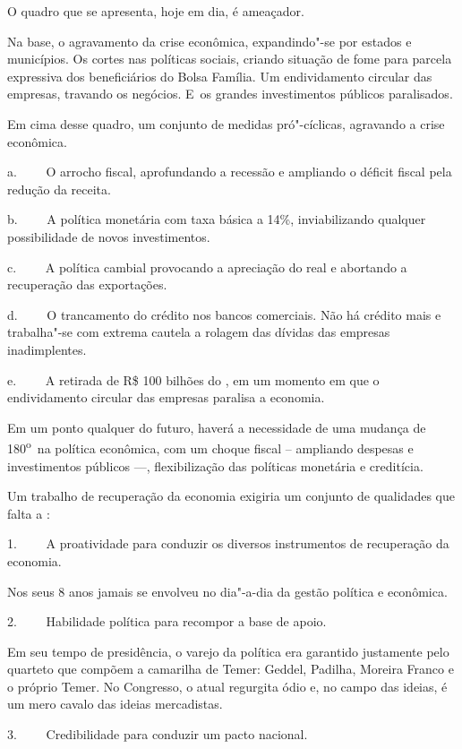 O quadro que se apresenta, hoje em dia, é ameaçador.

Na base, o agravamento da crise econômica, expandindo"-se por estados e
municípios. Os cortes nas políticas sociais, criando situação de fome
para parcela expressiva dos beneficiários do Bolsa Família. Um
endividamento circular das empresas, travando os negócios. E~os grandes
investimentos públicos paralisados.

Em cima desse quadro, um conjunto de medidas pró"-cíclicas, agravando a
crise econômica.

a.~~~~ O arrocho fiscal, aprofundando a recessão e ampliando o déficit
fiscal pela redução da receita.

b.~~~~ A política monetária com taxa básica a 14\%, inviabilizando
qualquer possibilidade de novos investimentos.

c.~~~~ A política cambial provocando a apreciação do real e abortando a
recuperação das exportações.

d.~~~~ O trancamento do crédito nos bancos comerciais. Não há crédito
mais e trabalha"-se com extrema cautela a rolagem das dívidas das
empresas inadimplentes.

e.~~~~ A retirada de R\$ 100 bilhões do , em um momento em que o
endividamento circular das empresas paralisa a economia.

Em um ponto qualquer do futuro, haverá a necessidade de uma mudança de
180\textsuperscript{o}~na política econômica, com um choque fiscal --
ampliando despesas e investimentos públicos \mbox{---,} flexibilização das
políticas monetária e creditícia.

Um trabalho de recuperação da economia exigiria um conjunto de
qualidades que falta a :

1.~~~~ A proatividade para conduzir os diversos instrumentos de
recuperação da economia.

Nos seus 8 anos jamais se envolveu no dia"-a-dia da gestão política e
econômica.

2.~~~~ Habilidade política para recompor a base de apoio.

Em seu tempo de presidência, o varejo da política era garantido
justamente pelo quarteto que compõem a camarilha de Temer: Geddel,
Padilha, Moreira Franco e o próprio Temer. No Congresso, o  atual
regurgita ódio e, no campo das ideias, é um mero cavalo das ideias
mercadistas.

3.~~~~ Credibilidade para conduzir um pacto nacional.

